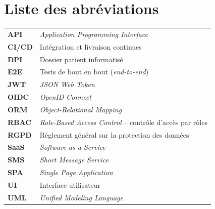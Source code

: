 \chapter*{Liste des abréviations}
\thispagestyle{liminaire}

\begin{longtable}{>{\bfseries}p{2.6cm} p{12cm}}
API & \textit{Application Programming Interface} \\
CI/CD & Intégration et livraison continues \\
DPI & Dossier patient informatisé \\
E2E & Tests de bout en bout (\textit{end-to-end}) \\
JWT & \textit{JSON Web Token} \\
OIDC & \textit{OpenID Connect} \\
ORM & \textit{Object-Relational Mapping} \\
RBAC & \textit{Role-Based Access Control} -- contrôle d'accès par rôles \\
RGPD & Règlement général sur la protection des données \\
SaaS & \textit{Software as a Service} \\
SMS & \textit{Short Message Service} \\
SPA & \textit{Single Page Application} \\
UI & Interface utilisateur \\
UML & \textit{Unified Modeling Language} \\
\end{longtable}
